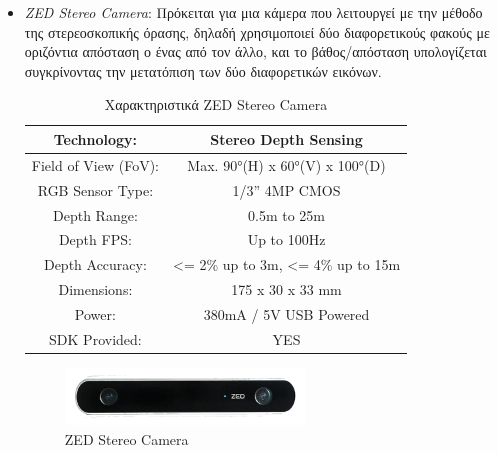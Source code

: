 \begin{itemize}
    \item \emph{ZED Stereo Camera}: Πρόκειται για μια κάμερα που λειτουργεί με την μέθοδο της στερεοσκοπικής όρασης, δηλαδή χρησιμοποιεί δύο διαφορετικούς φακούς με οριζόντια απόσταση ο ένας από τον άλλο, και το βάθος/απόσταση υπολογίζεται συγκρίνοντας την μετατόπιση των δύο διαφορετικών εικόνων.
    \begin{table}[H]
    \centering
    \begin{tabular}{|c|c|}
        \hline
        Technology: & Stereo Depth Sensing\\
        \hline
        Field of View (FoV): & Max. 90°(H) x 60°(V) x 100°(D)\\
        \hline
        RGB Sensor Type: & 1/3” 4MP CMOS\\
        \hline
        Depth Range: & 0.5m to 25m\\
        \hline
        Depth FPS: & Up to 100Hz\\
        \hline
        Depth Accuracy: & <= 2\% up to 3m, <= 4\% up to 15m\\
        \hline
        Dimensions: & 175 x 30 x 33 mm\\ 
        \hline
        Power: & 380mA / 5V USB Powered\\
        \hline
        SDK Provided: & YES\\
        \hline
    \end{tabular}
    \caption{Χαρακτηριστικά ZED Stereo Camera \cite{ZEDStere94:online}}
    \label{tab:zed}
    \end{table}
    \begin{figure}[H]
        \centering
        \includegraphics[width=0.6\textwidth]{images/zed.png}
        \caption{ZED Stereo Camera}
        \label{fig:zed}
    \end{figure}


\end{itemize}
